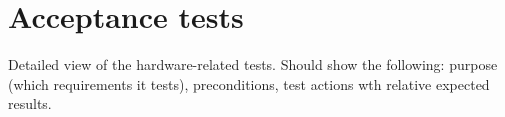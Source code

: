 \section{Acceptance tests}

Detailed view of the hardware-related tests.
Should show the following: purpose (which requirements it tests), preconditions, test actions wth relative expected results.